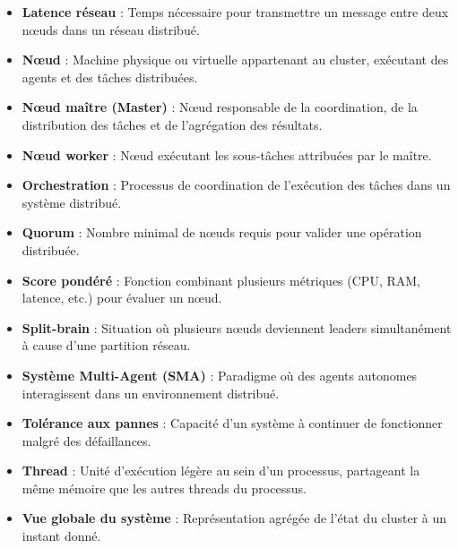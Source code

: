 \documentclass[12pt,a4paper]{report}
\begin{document}
\begin{itemize}
\item[*] \textbf{Latence réseau} : Temps nécessaire pour transmettre un message entre deux nœuds dans un réseau distribué.

\item[*] \textbf{Nœud} : Machine physique ou virtuelle appartenant au cluster, exécutant des agents et des tâches distribuées.

\item[*] \textbf{Nœud maître (Master)} : Nœud responsable de la coordination, de la distribution des tâches et de l'agrégation des résultats.

\item[*] \textbf{Nœud worker} : Nœud exécutant les sous-tâches attribuées par le maître.

\item[*] \textbf{Orchestration} : Processus de coordination de l'exécution des tâches dans un système distribué.

\item[*] \textbf{Quorum} : Nombre minimal de nœuds requis pour valider une opération distribuée.

\item[*] \textbf{Score pondéré} : Fonction combinant plusieurs métriques (CPU, RAM, latence, etc.) pour évaluer un nœud.

\item[*] \textbf{Split-brain} : Situation où plusieurs nœuds deviennent leaders simultanément à cause d'une partition réseau.

\item[*] \textbf{Système Multi-Agent (SMA)} : Paradigme où des agents autonomes interagissent dans un environnement distribué.

\item[*] \textbf{Tolérance aux pannes} : Capacité d'un système à continuer de fonctionner malgré des défaillances.

\item[*] \textbf{Thread} : Unité d’exécution légère au sein d’un processus, partageant la même mémoire que les autres threads du processus. 

\item[*] \textbf{Vue globale du système} : Représentation agrégée de l'état du cluster à un instant donné.

\end{itemize}

\listoffigures
\end{document}

